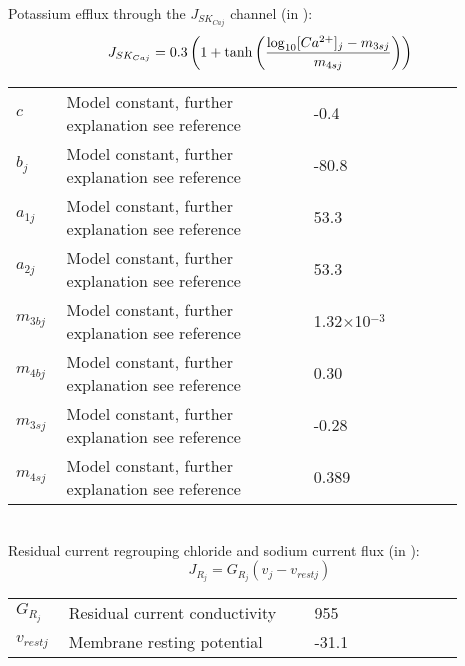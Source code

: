 \documentclass[fleqn]{report}
\numberwithin{equation}{section}
\numberwithin{equation}{section}
\begin{document}
							Potassium efflux through the $J_{SK_{Caj}}$ channel (in \uMs):
							\begin{equation} \label{eq:JSKCaj}
							J_{SK_{Caj}} = 0.3\left( 1+ \mathrm{tanh}  \left(  \frac{   \mathrm{log}_{10} [Ca^{2+}]_{j} -m_{3sj}  } {m_{4sj}}  \right)      \right) 
							\end{equation}
							\begin{table}[h!]
							\centering
							\begin{tabular}{ p{0.09\linewidth}  >{\footnotesize} p{0.5\linewidth}  >{\footnotesize} p{0.27\linewidth} >{\footnotesize} p{0.03\linewidth} }
							\hline
							$c$      				& Model constant, further explanation see reference					& -0.4 \uM			& \cite{Koenigsberger2006} \\
							$b_{j}$      			& Model constant, further explanation see reference					& -80.8 \mV		& \cite{Koenigsberger2006} \\
							$a_{1j}$      			& Model constant, further explanation see reference					& 53.3 \uMkeermV	& \cite{Koenigsberger2006} \\
							$a_{2j}$      			& Model constant, further explanation see reference					& 53.3 \mVpuM		& \cite{Koenigsberger2006} \\
							$m_{3bj}$      			& Model constant, further explanation see reference					& 1.32$\times$10$^{-3}$ \uMpmV	& \cite{Koenigsberger2006} \\
							$m_{4bj}$      			& Model constant, further explanation see reference					& 0.30	\uMkeermV	& \cite{Koenigsberger2006} \\
							$m_{3sj}$      			& Model constant, further explanation see reference					& -0.28 \uM		& \cite{Koenigsberger2006} \\
							$m_{4sj}$      			& Model constant, further explanation see reference					& 0.389 \uM		& \cite{Koenigsberger2006} \\
							\hline
							\end{tabular}
							\label{tab:JBKCAj}
							\end{table}
							\\
							Residual current regrouping chloride and sodium current flux (in \uMs):
							\begin{equation} \label{eq:JRj}
							J_{R_{j}} = G_{R_{j}} ( v_{j} - v_{rest j}  )
							\end{equation}
							\begin{table}[h!]
							\centering
							\begin{tabular}{ p{0.09\linewidth}  >{\footnotesize} p{0.5\linewidth}  >{\footnotesize} p{0.27\linewidth} >{\footnotesize} p{0.03\linewidth} }
							\hline
							$G_{R_{j}}$      		& Residual current conductivity										& 955 \pS			& \cite{Koenigsberger2006} \\
							$v_{rest j}$      		& Membrane resting potential						 				& -31.1 \mV		& \cite{Koenigsberger2006} \\
							\hline
							\end{tabular}
							\label{tab:JRj}
							\end{table}
\end{document}
